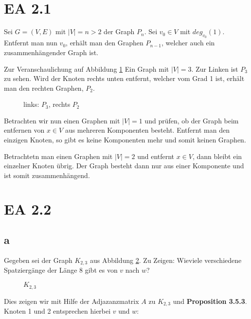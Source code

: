 \documentclass[12pt]{article}
\begin{document}
\section*{EA 2.1}
Sei $G=(V, E)$ mit $|V|=n > 2$ der Graph $P_n$. Sei $v_0 \in V$ mit $deg_{v_0}(1)$.
Entfernt man nun $v_0$, erhält man den Graphen $P_{n-1}$, welcher auch ein zusammenhängender Graph ist.

Zur Veranschaulichung auf Abbildung \ref{img:grafik-du} Ein Graph mit $|V|=3$. Zur Linken ist $P_3$ zu sehen. 
Wird der Knoten rechts unten entfernt, welcher vom Grad 1 ist, erhält man den rechten Graphen, $P_2$. 



\begin{figure}[h]
	\centering
	\scalebox{.5}{}
	\caption{links: $P_3$, rechts $P_2$}
	\label{img:grafik-du}
\end{figure}

Betrachten wir nun einen Graphen mit $|V|=1$ und prüfen, ob der Graph beim entfernen von
$x \in V$ aus mehreren Komponenten besteht. Entfernt man den einzigen Knoten, so gibt es keine
Komponenten mehr und somit keinen Graphen.

Betrachtetn man einen Graphen mit $|V|=2$ und entfernt $x \in V$, dann bleibt ein einzelner
Knoten übrig. Der Graph besteht dann nur aus einer Komponente und ist somit zusammenhängend.


\section*{EA 2.2}
\subsection*{a}

Gegeben sei der Graph $K_{2,3}$ aus Abbildung \ref{img:grafik-dummy}. Zu Zeigen: Wieviele verschiedene Spatziergänge der Länge $8$ gibt es von $v$ nach $w$?

\begin{figure}[h]
	\centering
	\scalebox{.5}{}
	\caption{$K_{2,3}$}
	\label{img:grafik-dummy}
\end{figure}


Dies zeigen wir mit Hilfe der Adjazanzmatrix $A$ zu $K_{2,3}$ und \textbf{Proposition 3.5.3}.
Knoten 1 und 2 entsprechen hierbei $v$ und $w$:
\end{document}
